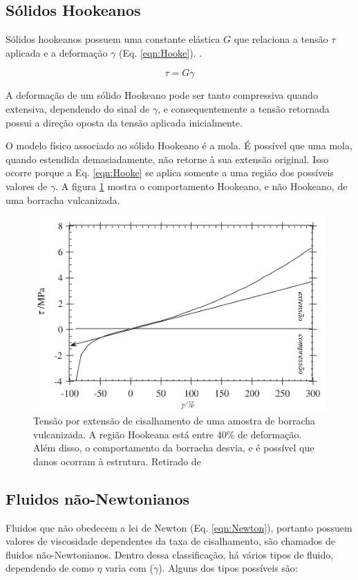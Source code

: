 			\subsection{Sólidos Hookeanos}
			
			Sólidos hookeanos possuem uma constante elástica \(G\) que relaciona a tensão \(\tau\) aplicada e a deformação \(\gamma\) (Eq. \ref{eqn:Hooke}). .
			
			\begin{equation} 
				\tau = G\gamma
				\label{eqn:Hooke}
			\end{equation} 
			
			A deformação de um sólido Hookeano pode ser tanto compressiva quando extensiva, dependendo do sinal de \(\gamma\), e consequentemente a tensão retornada possui a direção oposta da tensão aplicada inicialmente. 
			
			O modelo físico associado ao sólido Hookeano é a mola. É possível que uma mola, quando estendida demasiadamente, não retorne à sua extensão original. Isso ocorre porque a Eq. \ref{eqn:Hooke} se aplica somente a uma região dos possíveis valores de \(\gamma\). A figura \ref{fig:naohookeano_goodwinhughes} mostra o comportamento Hookeano, e não Hookeano, de uma borracha vulcanizada.
					
			\begin{figure}
				\centering
				\includegraphics[width=0.7\linewidth]{imagens/artigos/nao_hookeano_goodwin_hughes}
				\caption{Tensão por extensão de cisalhamento de uma amostra de borracha vulcanizada. A região Hookeana está entre 40\% de deformação. Além disso, o comportamento da borracha desvia, e é possível que danos ocorram à estrutura. Retirado de %
				}
				\label{fig:naohookeano_goodwinhughes}
			\end{figure}

			\subsection{Fluidos não-Newtonianos} 
			\label{sec:teoria_fluidos_NN}
			Fluidos que não obedecem a lei de Newton (Eq. \ref{eqn:Newton}), portanto possuem valores de viscosidade dependentes da taxa de cisalhamento, são chamados de fluidos não-Newtonianos. Dentro dessa classificação, há vários tipos de fluido, dependendo de como \(\eta\) varia com (\(\dot{\gamma}\)). Alguns dos tipos possíveis são:
			
